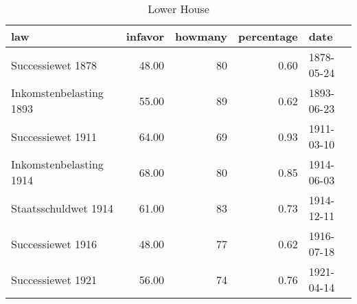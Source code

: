 \begin{table}[ht]
\centering
\begin{tabular}{lrrrl}
  \hline
law & infavor & howmany & percentage & date \\ 
  \hline
Successiewet 1878 & 48.00 &  80 & 0.60 & 1878-05-24 \\ 
  Inkomstenbelasting 1893 & 55.00 &  89 & 0.62 & 1893-06-23 \\ 
  Successiewet 1911 & 64.00 &  69 & 0.93 & 1911-03-10 \\ 
  Inkomstenbelasting 1914 & 68.00 &  80 & 0.85 & 1914-06-03 \\ 
  Staatsschuldwet 1914 & 61.00 &  83 & 0.73 & 1914-12-11 \\ 
  Successiewet 1916 & 48.00 &  77 & 0.62 & 1916-07-18 \\ 
  Successiewet 1921 & 56.00 &  74 & 0.76 & 1921-04-14 \\ 
   \hline
\end{tabular}
\caption{Lower House} 
\end{table}
